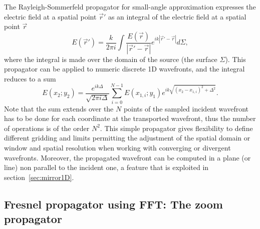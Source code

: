 \documentclass{iopconfser}
\begin{document}
The Rayleigh-Sommerfeld propagator for small-angle approximation expresses the electric field at a spatial point $\vec{r}'$ as an integral of the electric field at a spatial point $\vec{r}$ \cite{goodmanfourier}
\begin{equation}\label{eq:RSpropagator}
E(\vec{r}') =  \frac{k}{2 \pi i} \int \frac{E(\vec{r})}{|\vec{r}'-\vec{r}|} e^{ i k |\vec{r}' - \vec{r}|  }  d\Sigma,
\end{equation}
where the integral is made over the domain of the source (the surface $\Sigma$). 
This propagator can be applied to numeric discrete 1D wavefronts, and the integral reduces to a sum
\begin{equation}\label{eq:discreteRSpropagator}
E(x_2;y_2) = \frac{e^{i k \Delta}}{\sqrt{2 \pi i \Delta}}  \sum_{i=0}^{N-1}  E(x_{1,i};y_1) e^{i k \sqrt{(x_2 - x_{1,i})^2 + \Delta^2} }.
\end{equation}
Note that the sum extends over the $N$ points of the sampled incident wavefront has to be done for each coordinate at the transported wavefront, thus the number of operations is of the order $N^2$. This simple propagator gives flexibility to define different gridding and limits permitting the adjustment of the spatial domain or window and spatial resolution when working with converging or divergent wavefronts. Moreover, the propagated wavefront can be computed in a plane (or line) non parallel to the incident one, a feature that is exploited in section~\ref{sec:mirror1D}.


\subsection{Fresnel propagator using FFT: The zoom propagator}
\label{sec:zoomPropagator}
\end{document}
